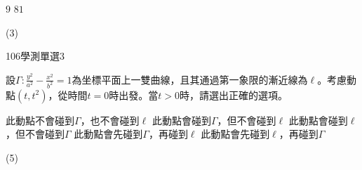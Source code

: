 \begin{QUESTIONS}
\begin{QUESTION}
\begin{QBODY}
\begin{QOPS}
				\QOP $9$      
				\QOP $81$
			\end{QOPS}
        \end{QBODY}
        \begin{QFROMS}
        \end{QFROMS}
        \begin{QTAGS}\end{QTAGS}
        \begin{QANS}
            (3)
        \end{QANS}
        \begin{QSOLLIST}
        \end{QSOLLIST}
        \begin{QEMPTYSPACE}
        \end{QEMPTYSPACE}
    \end{QUESTION}
    \begin{QUESTION}
        \begin{ExamInfo}{106}{學測}{單選}{3}
        \end{ExamInfo}
        \begin{ExamAnsRateInfo}{38}{71}{34}{9}
        \end{ExamAnsRateInfo}
        \begin{QBODY}
            設$\Gamma :\frac{{{y}^{2}}}{{{a}^{2}}}-\frac{{{x}^{2}}}{{{b}^{2}}}=1$為坐標平面上一雙曲線，且其通過第一象限的漸近線為$\ell $。考慮動點$(t,{{t}^{2}})$，從時間$t=0$時出發。當$t>0$時，請選出正確的選項。
			\begin{QOPS}
			\QOP 此動點不會碰到$\Gamma $，也不會碰到$\ell $
			\QOP 此動點會碰到$\Gamma $，但不會碰到$\ell $
			\QOP 此動點會碰到$\ell $，但不會碰到$\Gamma $
			\QOP 此動點會先碰到$\Gamma $，再碰到$\ell $
			\QOP 此動點會先碰到$\ell $，再碰到$\Gamma $
			\end{QOPS}
        \end{QBODY}
        \begin{QFROMS}
        \end{QFROMS}
        \begin{QTAGS}\end{QTAGS}
        \begin{QANS}
            (5)
        \end{QANS}
        \begin{QSOLLIST}
        \end{QSOLLIST}
        \begin{QEMPTYSPACE}
        \end{QEMPTYSPACE}

\end{QUESTION}
\end{QUESTIONS}
